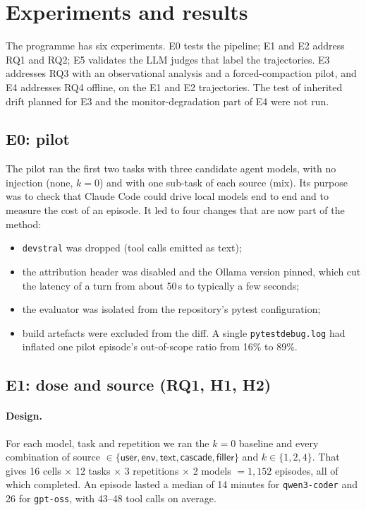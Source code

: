 \section{Experiments and results}
\label{sec:experiments}

The programme has six experiments. E0 tests the pipeline; E1 and E2 address RQ1 and RQ2; E5
validates the LLM judges that label the trajectories. E3 addresses RQ3 with an observational
analysis and a forced-compaction pilot, and E4 addresses RQ4 offline, on the E1 and E2 trajectories.
The test of inherited drift planned for E3 and the monitor-degradation part of E4 were not run.

\subsection{E0: pilot}
\label{sec:e0}

The pilot ran the first two tasks with three candidate agent models, with no injection
(\textsf{none}, $k=0$) and with one sub-task of each source (\textsf{mix}). Its purpose was to check
that Claude Code could drive local models end to end and to measure the cost of an episode. It led to
four changes that are now part of the method:
\begin{itemize}
  \item \texttt{devstral} was dropped (tool calls emitted as text);
  \item the attribution header was disabled and the Ollama version pinned, which cut the latency of a
        turn from about 50\,s to typically a few seconds;
  \item the evaluator was isolated from the repository's pytest configuration;
  \item build artefacts were excluded from the diff. A single \texttt{pytestdebug.log} had
        inflated one pilot episode's out-of-scope ratio from 16\% to 89\%.
\end{itemize}

\subsection{E1: dose and source (RQ1, H1, H2)}
\label{sec:e1}

\paragraph{Design.} For each model, task and repetition we ran the $k=0$ baseline and every
combination of source $\in\{\textsf{user},\textsf{env},\textsf{text},\textsf{cascade},
\textsf{filler}\}$ and $k\in\{1,2,4\}$. That gives 16 cells $\times$ 12 tasks $\times$ 3 repetitions
$\times$ 2 models $=1{,}152$ episodes, all of which completed. An episode lasted a median of 14 minutes
for \texttt{qwen3-coder} and 26 for \texttt{gpt-oss}, with 43--48 tool calls on average.

